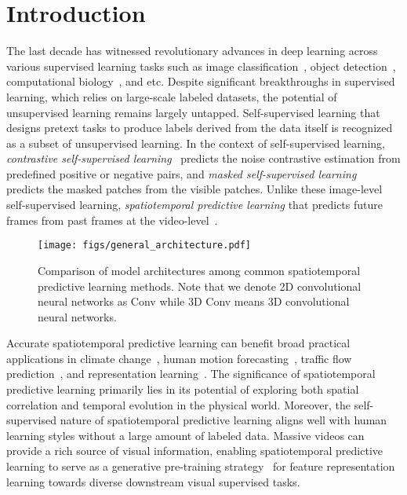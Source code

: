 \documentclass[10pt,twocolumn,letterpaper]{article}
\begin{document}
\section{Introduction}
\label{sec:intro}
The last decade has witnessed revolutionary advances in deep learning across various supervised learning tasks such as image classification~\cite{he2016deep,tan2019efficientnet,li2022efficient}, object detection~\cite{ren2015faster,redmon2016you}, computational biology~\cite{jumper2021highly,tan2022target,tan2022rfold,gao2022alphadesign,gao2022pifold}, and etc. Despite significant breakthroughs in supervised learning, which relies on large-scale labeled datasets, the potential of unsupervised learning remains largely untapped. 
Self-supervised learning that designs pretext tasks to produce labels derived from the data itself is recognized as a subset of unsupervised learning. In the context of self-supervised learning, \textit{contrastive self-supervised learning}~\cite{he2020momentum,chen2020simple,NEURIPS2020_f3ada80d,chen2020big,wang2020understanding,zbontar2021barlow,tan2021co,tan2022hyperspherical} predicts the noise contrastive estimation from predefined positive or negative pairs, and \textit{masked self-supervised learning}~\cite{kenton2019bert,yang2019xlnet,lewis2020bart,dosovitskiy2020image,he2021masked,liu2021swin} predicts the masked patches from the visible patches. Unlike these image-level self-supervised learning, \textit{spatiotemporal predictive learning} that predicts future frames from past frames at the video-level~\cite{finn2016unsupervised,locatello2019challenging,greff2019multi,mathieu2019disentangling,khemakhem2020variational,castrejon2019improved}. 

\begin{figure}[htbp]
\centering
\texttt{[image: figs/general\_architecture.pdf]} 
\caption{Comparison of model architectures among common spatiotemporal predictive learning methods. Note that we denote 2D convolutional neural networks as Conv while 3D Conv means 3D convolutional neural networks.}
\label{fig:general_architecture} 
\end{figure}

Accurate spatiotemporal predictive learning can benefit broad practical applications in climate change~\cite{shi2015convolutional,reichstein2019deep}, human motion forecasting~\cite{zhang2017learning,wang2018rgb}, traffic flow prediction~\cite{fang2019gstnet,wang2019memory}, and representation learning~\cite{qian2021spatiotemporal,jenni2020video}. The significance of spatiotemporal predictive learning primarily lies in its potential of exploring both spatial correlation and temporal evolution in the physical world. Moreover, the self-supervised nature of spatiotemporal predictive learning aligns well with human learning styles without a large amount of labeled data. Massive videos can provide a rich source of visual information, enabling spatiotemporal predictive learning to serve as a generative pre-training strategy~\cite{locatello2019challenging,hinton2021represent} for feature representation learning towards diverse downstream visual supervised tasks.
\end{document}

